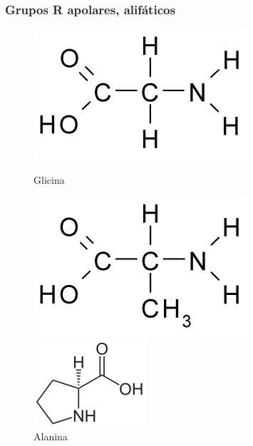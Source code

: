 \documentclass[a4paper,12pt]{article}
\begin{document}
 	\subsubsection*{Grupos R apolares, alifáticos}
 	\begin{figure}[H]
 		\begin{center}
 			\begin{minipage}{0.24\linewidth}
 				\centering   
 				\includegraphics[width=0.95\linewidth]{glycine.png}	
 				\caption{Glicina}
 				\label{fig:glycine}
 			\end{minipage}
 			\begin{minipage}{0.24\linewidth}
 				\centering   
 				\includegraphics[width=0.9\linewidth]{alanine.png}
 				\caption{Alanina}
 				\label{fig:alanine}
 			\end{minipage}
 			\begin{minipage}{0.24\linewidth}
 				\centering   
 				\includegraphics[width=0.8\linewidth]{proline.png}

\end{minipage}
\end{center}
\end{figure}
\end{document}
